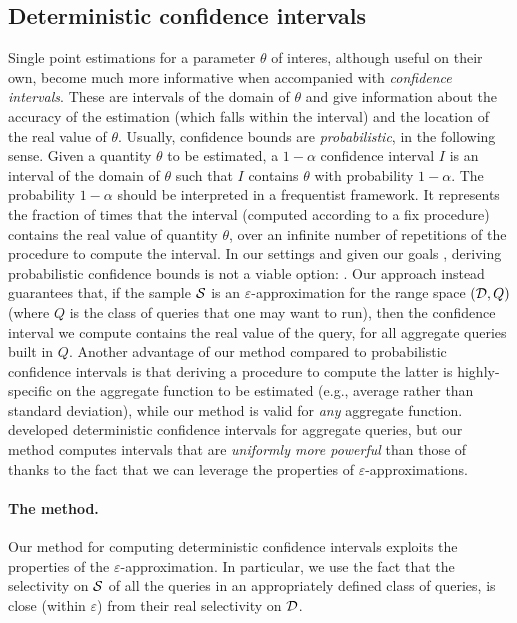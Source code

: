 \subsection{Deterministic confidence intervals}\label{sec:confint}
Single point estimations for a parameter $\theta$ of interes, although useful on their own, become much more
informative when accompanied with \emph{confidence intervals}. These are
intervals of the domain of $\theta$ and give information about
the accuracy of the estimation (which falls within the interval) and the
location of the real value of $\theta$. Usually,
confidence bounds are \emph{probabilistic}, in the following sense. Given a
quantity $\theta$ to be estimated, a $1-\alpha$ confidence interval $I$ is an
interval of the domain of $\theta$ such that $I$ contains $\theta$ with
probability $1-\alpha$. The probability $1-\alpha$ should be interpreted in a
frequentist framework. It represents the fraction of times that the interval
(computed according to a fix procedure) contains the real value of quantity
$\theta$, over an infinite number of repetitions of the procedure to compute the
interval. In our settings and given our goals
, deriving probabilistic confidence bounds
is not a viable option: . Our approach instead guarantees that, if the sample
${\cal S}$ is an $\varepsilon$-approximation for the range space $({\cal D},Q)$ (where $Q$ is the
class of queries that one may want to run), then the confidence interval we
compute contains the real value of the query, for all aggregate queries built in
$Q$. Another advantage of our method compared to probabilistic confidence intervals
is that deriving a procedure to compute the latter is highly-specific on the
aggregate function to be estimated (e.g., average rather than standard
deviation), while our method is valid for \emph{any} aggregate function. \citet{Haas96}
developed deterministic confidence intervals for aggregate queries, but our
method computes intervals that are \emph{uniformly more powerful} than those
of~\cite{Haas96} thanks to the fact that we can leverage the properties of
$\varepsilon$-approximations.


\paragraph{The method.} Our method for computing deterministic confidence
intervals exploits the properties of the $\varepsilon$-approximation. 
In particular, we use the fact that the selectivity on ${\cal S}$ of all the queries in an
appropriately defined class of queries, is close (within $\varepsilon$) from
their real selectivity on ${\cal D}$.

